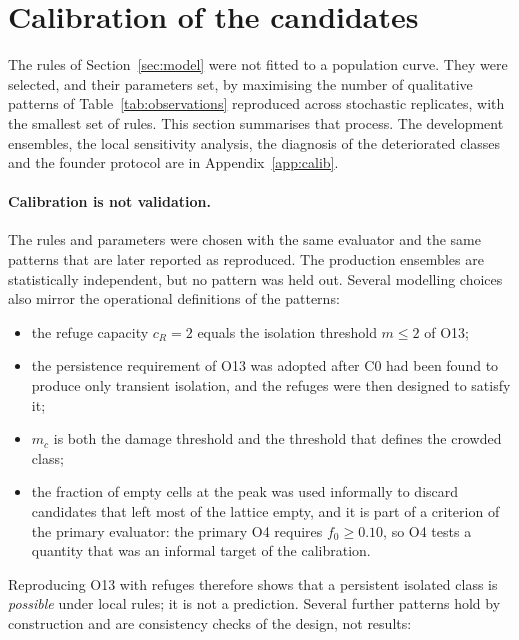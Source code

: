 \section{Calibration of the candidates}
\label{sec:calib}

The rules of Section~\ref{sec:model} were not fitted to a population curve. They were selected, and their
parameters set, by maximising the number of qualitative patterns of Table~\ref{tab:observations} reproduced
across stochastic replicates, with the smallest set of rules. This section summarises that process. The
development ensembles, the local sensitivity analysis, the diagnosis of the deteriorated classes and the
founder protocol are in Appendix~\ref{app:calib}.

\paragraph{Calibration is not validation.}
\label{sec:circularity}
The rules and parameters were chosen with the same evaluator and the same patterns that are later reported
as reproduced. The production ensembles are statistically independent, but no pattern was held out.
Several modelling choices also mirror the operational definitions of the patterns:
\begin{itemize}
  \item the refuge capacity $c_R=2$ equals the isolation threshold $m\le2$ of O13;
  \item the persistence requirement of O13 was adopted after \textsf{C0} had been found to produce only
    transient isolation, and the refuges were then designed to satisfy it;
  \item $m_c$ is both the damage threshold and the threshold that defines the crowded class;
  \item the fraction of empty cells at the peak was used informally to discard candidates that left most of the
    lattice empty, and it is part of a criterion of the primary evaluator: the primary O4 requires $f_0\ge0.10$,
    so O4 tests a quantity that was an informal target of the calibration.
\end{itemize}
Reproducing O13 with refuges therefore shows that a persistent isolated class is \emph{possible} under local
rules; it is not a prediction. Several further patterns hold by construction and are consistency checks of the
design, not results:
